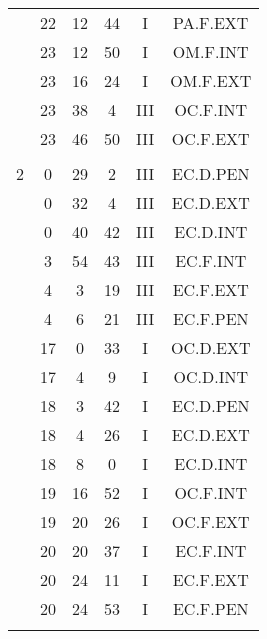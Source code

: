 \documentclass[12pt, a4paper]{article}
\begin{document}
\begin{multicols}{3}
{\begin{tabular}{c c c c c c}
	 	 	 	 & 22 & 12 & 44 & I & PA.F.EXT\\%
	 	 	 	 & 23 & 12 & 50 & I & OM.F.INT\\%
	 	 	 	 & 23 & 16 & 24 & I & OM.F.EXT\\%
	 	 	 	 & 23 & 38 & 4 & III & OC.F.INT\\%
	 	 	 	 & 23 & 46 & 50 & III & OC.F.EXT\\%
	 	 	 	 & & & & & \\%
	 	 	 	2 & 0 & 29 & 2 & III & EC.D.PEN\\%
	 	 	 	 & 0 & 32 & 4 & III & EC.D.EXT\\%
	 	 	 	 & 0 & 40 & 42 & III & EC.D.INT\\%
	 	 	 	 & 3 & 54 & 43 & III & EC.F.INT\\%
	 	 	 	 & 4 & 3 & 19 & III & EC.F.EXT\\%
	 	 	 	 & 4 & 6 & 21 & III & EC.F.PEN\\%
	 	 	 	 & 17 & 0 & 33 & I & OC.D.EXT\\%
	 	 	 	 & 17 & 4 & 9 & I & OC.D.INT\\%
	 	 	 	 & 18 & 3 & 42 & I & EC.D.PEN\\%
	 	 	 	 & 18 & 4 & 26 & I & EC.D.EXT\\%
	 	 	 	 & 18 & 8 & 0 & I & EC.D.INT\\%
	 	 	 	 & 19 & 16 & 52 & I & OC.F.INT\\%
	 	 	 	 & 19 & 20 & 26 & I & OC.F.EXT\\%
	 	 	 	 & 20 & 20 & 37 & I & EC.F.INT\\%
	 	 	 	 & 20 & 24 & 11 & I & EC.F.EXT\\%
	 	 	 	 & 20 & 24 & 53 & I & EC.F.PEN\\%
	 	 	 	 & & & & & \\%

\end{tabular}}
\end{multicols}
\end{document}
